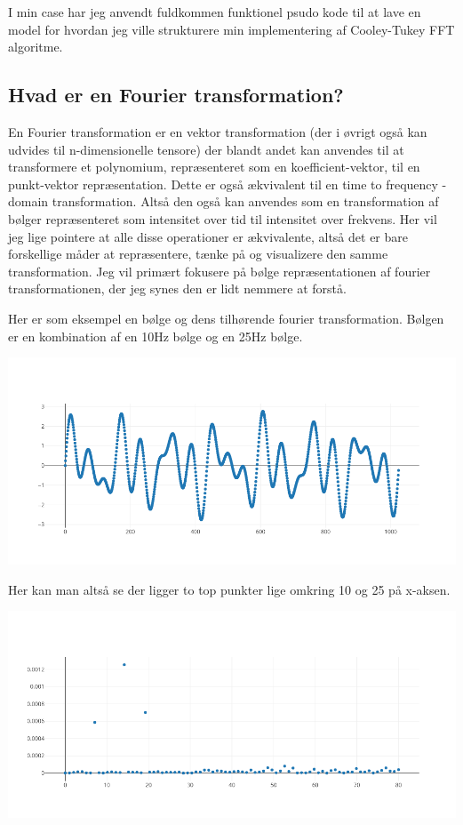 \documentclass[11pt,a4paper]{article}
\begin{document}
I min case har jeg anvendt fuldkommen funktionel psudo kode til at lave en model
for hvordan jeg ville strukturere min implementering af Cooley-Tukey FFT algoritme.

\subsection{Hvad er en Fourier transformation?}
\label{sec:orged206c0}
\newpage

En Fourier transformation er en vektor transformation (der i øvrigt også kan udvides til n-dimensionelle tensore)
der blandt andet kan anvendes til at transformere et polynomium,
repræsenteret som en koefficient-vektor, til en punkt-vektor repræsentation.
Dette er også ækvivalent til en time to frequency -domain transformation.
Altså den også kan anvendes som en transformation af bølger repræsenteret som intensitet over tid til intensitet over frekvens.
Her vil jeg lige pointere at alle disse operationer er ækvivalente, altså det er bare forskellige måder at repræsentere, tænke på og visualizere den samme transformation.
Jeg vil primært fokusere på bølge repræsentationen af fourier transformationen, der jeg synes den er lidt nemmere at forstå.

Her er som eksempel en bølge og dens tilhørende fourier transformation.
Bølgen er en kombination af en 10Hz bølge og en 25Hz bølge.

\begin{center}
\includegraphics[width=.9\linewidth]{./source_plot2.png}
\end{center}

Her kan man altså se der ligger to top punkter lige omkring 10 og 25 på x-aksen.
\begin{center}
\includegraphics[width=.9\linewidth]{./plot2.png}
\end{center}
\end{document}
